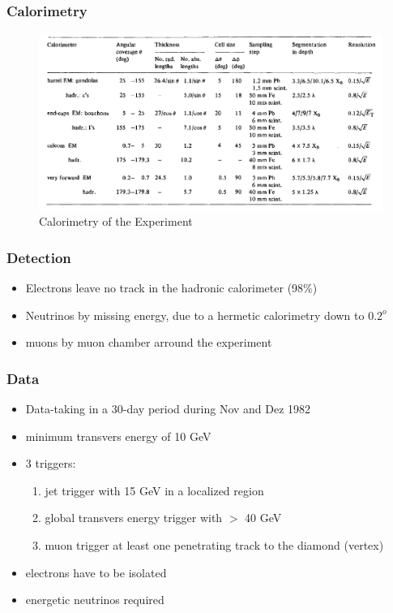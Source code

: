 \documentclass{beamer}
\begin{document}

\begin{frame}
	\frametitle{Calorimetry}
	\begin{figure}
		\includegraphics[width=1.0\textwidth]{calorimetry}
		\caption{Calorimetry of the Experiment}
		\label{fig:calorimetry}
	\end{figure}
\end{frame}

\begin{frame}
	\frametitle{Detection}
	\begin{itemize}
		\item Electrons leave no track in the hadronic calorimeter (98\%)
		\item Neutrinos by missing energy, due to a hermetic calorimetry down to $0.2^o$
		\item muons by muon chamber arround the experiment
	\end{itemize}
\end{frame}

\begin{frame}
	\frametitle{Data}
	\begin{itemize}
		\item Data-taking in a 30-day period during Nov and Dez 1982
		\item minimum transvers energy of 10 GeV
		\item 3 triggers:
		      \begin{enumerate}
		      	\item jet trigger with 15 GeV in a localized region
		      	\item global transvers energy trigger with $>$ 40 GeV
		      	\item muon trigger at least one penetrating track to the diamond (vertex)
		      \end{enumerate}
		\item electrons have to be isolated
		\item energetic neutrinos required
	\end{itemize}
\end{frame}
\end{document}

